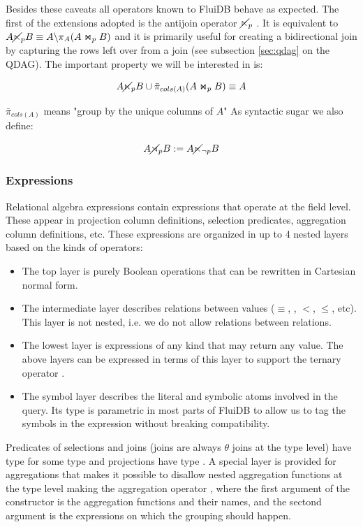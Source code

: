 Besides these caveats all operators known to FluiDB behave as expected. 
The first of the extensions adopted is the antijoin operator
\(\cancel\ltimes_p\) . It is equivalent to
\(A \cancel\ltimes_p B \equiv A \backslash \pi_A(A \Join_p B)\) and it is
primarily useful for creating a bidirectional join by capturing the
rows left over from a join (see subsection \ref{sec:qdag} on the
QDAG). The important property we will be interested in is:

\[
  A \cancel\ltimes_p B \cup \bar\pi_{cols(A)}(A \Join_p B) \equiv A
\]

\(\bar{\pi}_{cols(A)}\) means "group by the unique columns of \(A\)"
As syntactic sugar we also define:

\[
  A \cancel\rtimes_p B := A \cancel\ltimes_{\neg p} B
\]

\subsubsection{Expressions}
\label{sec:expressions_predicates}

Relational algebra expressions contain expressions that operate at the
field level. These appear in projection column definitions, selection
predicates, aggregation column definitions, etc. These expressions are
organized in up to 4 nested layers based on the kinds of operators:

\begin{itemize}
\item The top layer is purely Boolean operations  that 
  can be rewritten in Cartesian normal form.
\item The intermediate layer  describes relations between values
  (\(\equiv\), , \(<\), \(\le\), etc). This layer is not
  nested, i.e. we do not allow relations between relations.
\item The lowest layer  is expressions of any kind that may
  return any value. The above layers can be expressed in terms of this
  layer to support the ternary operator .
\item The symbol layer describes the literal and symbolic atoms involved in the query.
  Its type is parametric in most parts of FluiDB to allow 
  us to tag the symbols in the expression without breaking compatibility.
\end{itemize}

Predicates of selections and joins (joins are always \(\theta\) joins
at the type level) have type  for some type
 and projections have type . A
special layer is provided for aggregations  that makes it
possible to disallow nested aggregation functions at the type level
making the aggregation operator , where the first argument of the constructor is the
aggregation functions and their names, and the sectond argument is the
expressions on which the grouping should happen.

